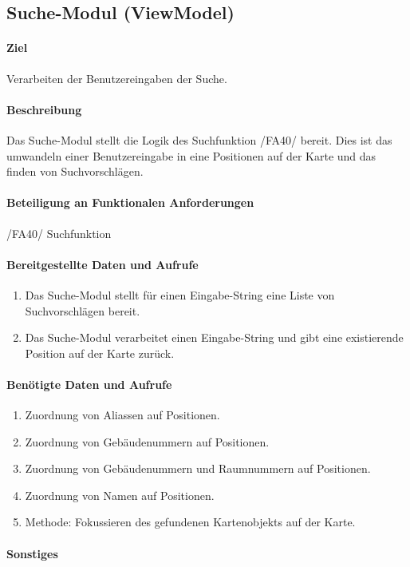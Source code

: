 \subsection{Suche-Modul (ViewModel)}
\paragraph{Ziel}
Verarbeiten der Benutzereingaben der Suche.
\paragraph{Beschreibung}
Das Suche-Modul stellt die Logik des Suchfunktion /FA40/ bereit. 
Dies ist das umwandeln einer Benutzereingabe in eine Positionen auf der Karte und das finden von Suchvorschlägen.
\paragraph{Beteiligung an Funktionalen Anforderungen}
/FA40/ Suchfunktion
\paragraph{Bereitgestellte Daten und Aufrufe}
\begin{enumerate}
    \item Das Suche-Modul stellt für einen Eingabe-String eine Liste von Suchvorschlägen bereit.
    \item Das Suche-Modul verarbeitet einen Eingabe-String und gibt eine existierende Position auf der Karte zurück.
\end{enumerate}
\paragraph{Benötigte Daten und Aufrufe}
\begin{enumerate}
    \item Zuordnung von Aliassen auf Positionen.
    \item Zuordnung von Gebäudenummern auf Positionen.
    \item Zuordnung von Gebäudenummern und Raumnummern auf Positionen.
    \item Zuordnung von Namen auf Positionen.
    \item Methode: Fokussieren des gefundenen Kartenobjekts auf der Karte.
\end{enumerate}
\paragraph{Sonstiges}